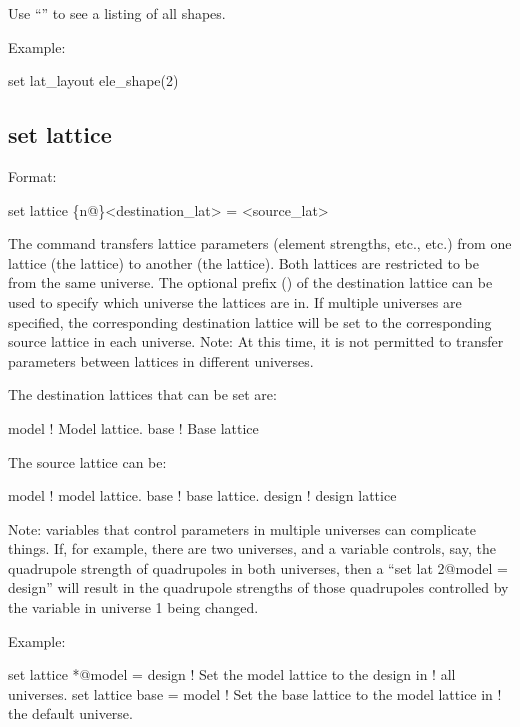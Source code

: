{{Use ``'' to see a listing of all shapes. 

Example:
\begin{example}
  set lat_layout ele_shape(2)%
\end{example}


\subsection{set lattice}
\label{s:set.lattice}

Format:
\begin{example}
  set lattice \{n@\}<destination_lat> = <source_lat>
\end{example}

The  command transfers lattice parameters (element strengths, etc., etc.)  from one
lattice (the  lattice) to another (the  lattice). Both lattices are
restricted to be from the same universe. The optional  prefix () of the
destination lattice can be used to specify which universe the lattices are in. If multiple universes
are specified, the corresponding destination lattice will be set to the corresponding source lattice
in each universe. Note: At this time, it is not permitted to transfer parameters between lattices in
different universes.

The destination lattices that can be set are:
\begin{example}
  model      ! Model lattice.
  base       ! Base lattice
\end{example}
The source lattice can be:
\begin{example}
  model       ! model lattice.
  base        ! base lattice.
  design      ! design lattice
\end{example}

Note: \tao variables that control parameters in multiple universes can complicate things. If, for
example, there are two universes, and a \tao variable controls, say, the quadrupole strength of
quadrupoles in both universes, then a ``set lat 2@model = design'' will result in the quadrupole
strengths of those quadrupoles controlled by the variable in universe 1 being changed.

Example:
\begin{example}
  set lattice *@model = design  ! Set the model lattice to the design in 
                                !   all universes.
  set lattice base = model      ! Set the base lattice to the model lattice in 
                                !   the default universe.
\end{example}

}}
